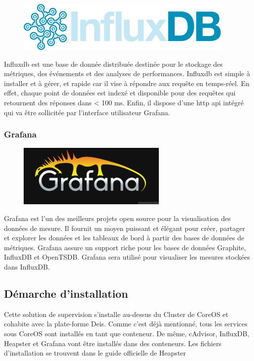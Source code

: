 \begin{onehalfspace}
\begin{figure}
\centering
\includegraphics[scale=0.2]{chapitre5/assets/influxdb}
\end{figure}
\noindent Influxdb est une base de donnée distribuée destinée pour le stockage des métriques, des événements et des analyses de performances. Influxdb est simple à installer et à gérer, et rapide car il vise à répondre aux requête en temps-réel. En effet, chaque point de données est indexé et disponible pour des requêtes qui retournent des réponses dans < 100 ms. Enfin, il dispose d'une \acrshort{http} \acrshort{api} intégré qui va être sollicitée par l'interface utilisateur Grafana.

\subsubsection*{Grafana}

\begin{figure}
\centering
\includegraphics[scale=0.3]{chapitre5/assets/grafana}
\end{figure}
\noindent Grafana est l'un des meilleurs projets open source pour la visualisation des données de mesure. Il fournit un moyen puissant et élégant pour créer, partager et explorer les données et les tableaux de bord à partir des bases de données de métriques. Grafana assure un support riche pour les bases de données Graphite, InfluxDB et OpenTSDB. Grafana sera utilisé pour visualiser les mesures stockées dans InfluxDB.


\subsection{Démarche d'installation}

Cette solution de supervision s'installe au-dessus du Cluster de CoreOS et cohabite avec la plate-forme Deis. Comme c'est déjà mentionné, tous les services sous CoreOS sont installés en tant que conteneur. De même, cAdvisor, InfluxDB, Heapster et Grafana vont être installés dans des conteneurs.
Les fichiers d'installation se trouvent dans le guide officielle de Heapster \cite{heapster-coreos}


\end{onehalfspace}
